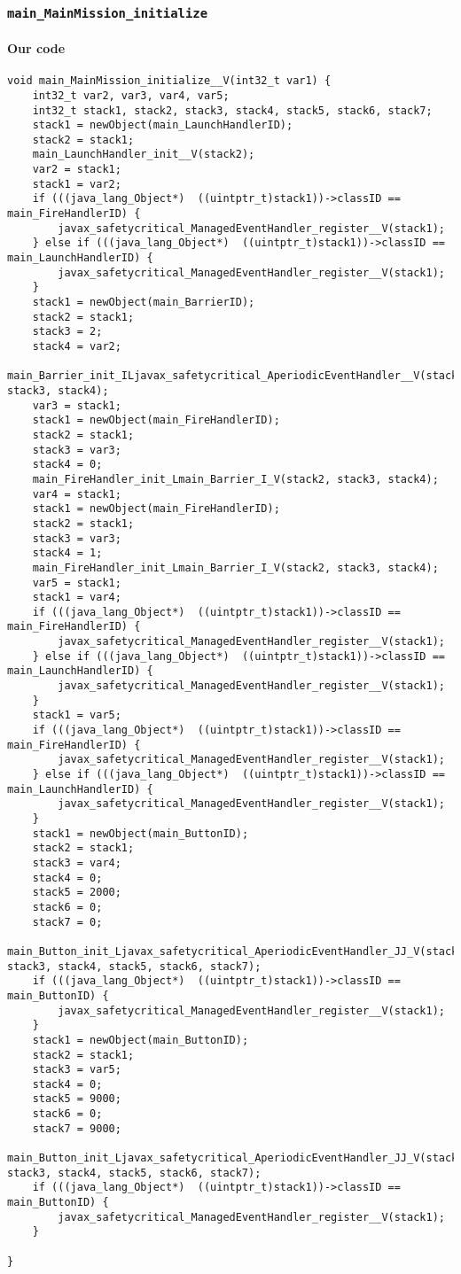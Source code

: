 \subsubsection{\texttt{main\_MainMission\_initialize}}

\paragraph{Our code}\hfill
\begin{lstlisting}[firstnumber=2437]
void main_MainMission_initialize__V(int32_t var1) {
	int32_t var2, var3, var4, var5;
	int32_t stack1, stack2, stack3, stack4, stack5, stack6, stack7;
	stack1 = newObject(main_LaunchHandlerID);
	stack2 = stack1;
	main_LaunchHandler_init__V(stack2);
	var2 = stack1;
	stack1 = var2;
	if (((java_lang_Object*)  ((uintptr_t)stack1))->classID == main_FireHandlerID) {
		javax_safetycritical_ManagedEventHandler_register__V(stack1);
	} else if (((java_lang_Object*)  ((uintptr_t)stack1))->classID == main_LaunchHandlerID) {
		javax_safetycritical_ManagedEventHandler_register__V(stack1);
	}
	stack1 = newObject(main_BarrierID);
	stack2 = stack1;
	stack3 = 2;
	stack4 = var2;
	main_Barrier_init_ILjavax_safetycritical_AperiodicEventHandler__V(stack2, stack3, stack4);
	var3 = stack1;
	stack1 = newObject(main_FireHandlerID);
	stack2 = stack1;
	stack3 = var3;
	stack4 = 0;
	main_FireHandler_init_Lmain_Barrier_I_V(stack2, stack3, stack4);
	var4 = stack1;
	stack1 = newObject(main_FireHandlerID);
	stack2 = stack1;
	stack3 = var3;
	stack4 = 1;
	main_FireHandler_init_Lmain_Barrier_I_V(stack2, stack3, stack4);
	var5 = stack1;
	stack1 = var4;
	if (((java_lang_Object*)  ((uintptr_t)stack1))->classID == main_FireHandlerID) {
		javax_safetycritical_ManagedEventHandler_register__V(stack1);
	} else if (((java_lang_Object*)  ((uintptr_t)stack1))->classID == main_LaunchHandlerID) {
		javax_safetycritical_ManagedEventHandler_register__V(stack1);
	}
	stack1 = var5;
	if (((java_lang_Object*)  ((uintptr_t)stack1))->classID == main_FireHandlerID) {
		javax_safetycritical_ManagedEventHandler_register__V(stack1);
	} else if (((java_lang_Object*)  ((uintptr_t)stack1))->classID == main_LaunchHandlerID) {
		javax_safetycritical_ManagedEventHandler_register__V(stack1);
	}
	stack1 = newObject(main_ButtonID);
	stack2 = stack1;
	stack3 = var4;
	stack4 = 0;
	stack5 = 2000;
	stack6 = 0;
	stack7 = 0;
	main_Button_init_Ljavax_safetycritical_AperiodicEventHandler_JJ_V(stack2, stack3, stack4, stack5, stack6, stack7);
	if (((java_lang_Object*)  ((uintptr_t)stack1))->classID == main_ButtonID) {
		javax_safetycritical_ManagedEventHandler_register__V(stack1);
	}
	stack1 = newObject(main_ButtonID);
	stack2 = stack1;
	stack3 = var5;
	stack4 = 0;
	stack5 = 9000;
	stack6 = 0;
	stack7 = 9000;
	main_Button_init_Ljavax_safetycritical_AperiodicEventHandler_JJ_V(stack2, stack3, stack4, stack5, stack6, stack7);
	if (((java_lang_Object*)  ((uintptr_t)stack1))->classID == main_ButtonID) {
		javax_safetycritical_ManagedEventHandler_register__V(stack1);
	}

}
\end{lstlisting}

